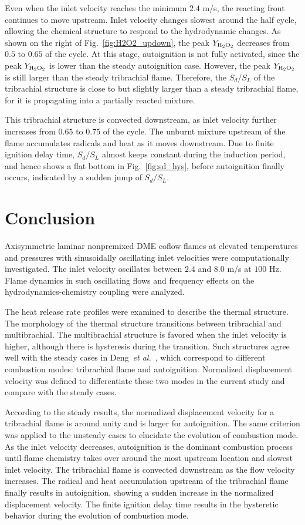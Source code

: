 \documentclass{essci}
\begin{document}
Even when the inlet velocity reaches the minimum $2.4$ m/s, the reacting front continues to move upstream.  Inlet velocity changes slowest around the half cycle, allowing the chemical structure to respond to the hydrodynamic changes.  As shown on the right of Fig.~\ref{fig:H2O2_updown}, the peak $Y_{\rm H{_2}O{_2}}$ decreases from $0.5$ to $0.65$ of the cycle.  At this stage, autoignition is not fully activated, since the peak $Y_{\rm H{_2}O{_2}}$ is lower than the steady autoignition case.  However, the peak $Y_{\rm H{_2}O{_2}}$ is still larger than the steady tribrachial flame.  Therefore, the $S_d/S_L$ of the tribrachial structure is close to but slightly larger than a steady tribrachial flame, for it is propagating into a partially reacted mixture.

This tribrachial structure is convected downstream, as inlet velocity further increases from $0.65$ to $0.75$ of the cycle.  The unburnt mixture upstream of the flame accumulates radicals and heat as it moves downstream.  Due to finite ignition delay time, $S_d/S_L$ almost keeps constant during the induction period, and hence shows a flat bottom in Fig.~\ref{fig:sd_hys}, before autoignition finally occurs, indicated by a sudden jump of $S_d/S_L$.

\section{Conclusion}

Axisymmetric laminar nonpremixed DME coflow flames at elevated temperatures and pressures with sinusoidally oscillating inlet velocities were computationally investigated.  The inlet velocity oscillates between $2.4$ and $8.0$ m/s at $100$ Hz.  Flame dynamics in such oscillating flows and frequency effects on the hydrodynamics-chemistry coupling were analyzed.

The heat release rate profiles were examined to describe the thermal structure.  The morphology of the thermal structure transitions between tribrachial and multibrachial.  The multibrachial structure is favored when the inlet velocity is higher, although there is hysteresis during the transition.  Such structures agree well with the steady cases in Deng~\emph{et al.}~\cite{deng15b}, which correspond to different combustion modes: tribrachial flame and autoignition.  Normalized displacement velocity was defined to differentiate these two modes in the current study and compare with the steady cases.

According to the steady results, the normalized displacement velocity for a tribrachial flame is around unity and is larger for autoignition.  The same criterion was applied to the unsteady cases to elucidate the evolution of combustion mode.  As the inlet velocity decreases, autoignition is the dominant combustion process until flame chemistry takes over around the most upstream location and slowest inlet velocity.  The tribrachial flame is convected downstream as the flow velocity increases.  The radical and heat accumulation upstream of the tribrachial flame finally results in autoignition, showing a sudden increase in the normalized displacement velocity.  The finite ignition delay time results in the hysteretic behavior during the evolution of combustion mode.
\end{document}
